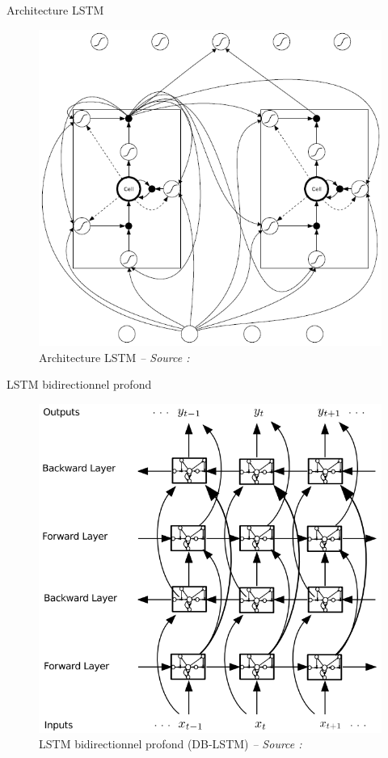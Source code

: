 \begin{frame}{Architecture LSTM}
    
    \begin{figure}
        \includegraphics[height=.75\textheight,width=\textwidth,keepaspectratio]{images/arch_lstm}
        \caption{Architecture LSTM {\scriptsize\it -- Source : \cite{Graves12}}}
    \end{figure}
    
\end{frame}

\begin{frame}{LSTM bidirectionnel profond}
    
    \begin{figure}
        \includegraphics[height=.75\textheight,width=\textwidth,keepaspectratio]{images/arch_dblstm}
        \caption{LSTM bidirectionnel profond (DB-LSTM) {\scriptsize\it -- Source : \cite{Graves13b}}}
    \end{figure}
    
\end{frame}
